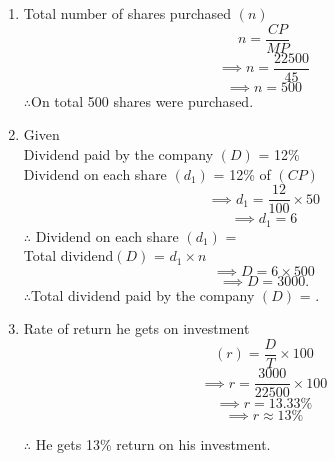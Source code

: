 \documentclass[journal,12pt,twocolumn]{IEEEtran}
\begin{document}
\begin{enumerate}
    \item 
    Total number of shares purchased \((n)\) \[ n =\frac{CP}{MP}\]
    \[\implies n = \frac{22500}{45}\]
         \[\implies n = 500\]
    $\therefore$On total 500 shares were purchased.
    \item
    Given\\
    Dividend paid by the company \((D)\) = 12\%\\
    Dividend on each share \((d_1)\) = 12\% of \((CP)\)  
    \[\implies d_1 = \frac{12}{100}\times 50 \]
    \[\implies d_1 = 6\]
    $\therefore$ Dividend on each share \((d_1)\) = \\
   Total dividend\((D)\) = $ d_1 \times n $
  \[\implies D = 6 \times 500\]
  \[\implies D = 3000.\]
    $\therefore$Total dividend paid by the company \((D)\) = .
    \item
    Rate of return he gets on investment
    \[ (r) = \frac{D}{T} \times 100\]
    \[\implies r = \frac{3000}{22500}\times 100\]
    \[\implies r = 13.33\% \]
    \[\implies r \approx 13\%\]
    
    $\therefore$ He gets 13\% return on his investment.
\end{enumerate}

\end{document}
